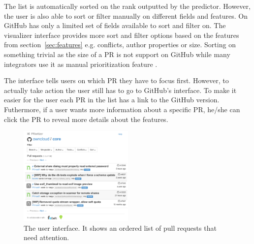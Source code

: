 \begin{description}
The list is automatically sorted on the rank outputted by the predictor.
However, the user is also able to sort or filter manually on different fields and features.
On GitHub has only a limited set of fields available to sort and filter on.
The visualizer interface provides more sort and filter options based on the features from section~\ref{sec:features} e.g. conflicts, author properties or size.
Sorting on something trivial as the size of a PR is not support on GitHub while many integrators use it as manual prioritization feature \cite{GZSD15}.

The interface tells users on which PR they have to focus first.
However, to actually take action the user still has to go to GitHub's interface.
To make it easier for the user each PR in the list has a link to the GitHub version.
Futhermore, if a user wants more information about a specific PR, he/she can click the PR to reveal more details about the features.
\end{description}

\begin{figure}
  \centering
  \includegraphics[width=0.5\textwidth]{../figs/interface.pdf}
  \caption[The user interface]
   {The user interface. It shows an ordered list of pull requests that need attention.}
  \label{fig:ui}
\end{figure}
